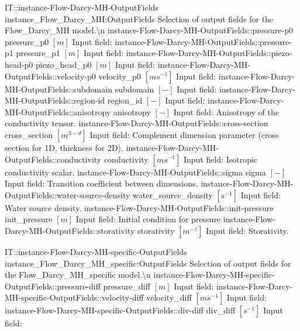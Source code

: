 \begin{SelectionType}
	{IT::instance-Flow-Darcy-MH-OutputFields}
	{instance{\_}Flow{\_}Darcy{\_}MH:OutputFields}
	{{{Selection of output fields for the Flow{\_}Darcy{\_}MH model.{\textbackslash}n}%
}}
		\SelectionItem
			{instance-Flow-Darcy-MH-OutputFields::pressure-p0}
			{pressure{\_}p0}
			{{{}{$[m]$}{ Input field: }%
}}
		\SelectionItem
			{instance-Flow-Darcy-MH-OutputFields::pressure-p1}
			{pressure{\_}p1}
			{{{}{$[m]$}{ Input field: }%
}}
		\SelectionItem
			{instance-Flow-Darcy-MH-OutputFields::piezo-head-p0}
			{piezo{\_}head{\_}p0}
			{{{}{$[m]$}{ Input field: }%
}}
		\SelectionItem
			{instance-Flow-Darcy-MH-OutputFields::velocity-p0}
			{velocity{\_}p0}
			{{{}{$[ms^{-1}]$}{ Input field: }%
}}
		\SelectionItem
			{instance-Flow-Darcy-MH-OutputFields::subdomain}
			{subdomain}
			{{{}{$[-]$}{ Input field: }%
}}
		\SelectionItem
			{instance-Flow-Darcy-MH-OutputFields::region-id}
			{region{\_}id}
			{{{}{$[-]$}{ Input field: }%
}}
		\SelectionItem
			{instance-Flow-Darcy-MH-OutputFields::anisotropy}
			{anisotropy}
			{{{}{$[-]$}{ Input field: Anisotropy of the conductivity tensor.}%
}}
		\SelectionItem
			{instance-Flow-Darcy-MH-OutputFields::cross-section}
			{cross{\_}section}
			{{{}{$[m^{3-d}]$}{ Input field: Complement dimension parameter (cross section for 1D, thickness for 2D).}%
}}
		\SelectionItem
			{instance-Flow-Darcy-MH-OutputFields::conductivity}
			{conductivity}
			{{{}{$[ms^{-1}]$}{ Input field: Isotropic conductivity scalar.}%
}}
		\SelectionItem
			{instance-Flow-Darcy-MH-OutputFields::sigma}
			{sigma}
			{{{}{$[-]$}{ Input field: Transition coefficient between dimensions.}%
}}
		\SelectionItem
			{instance-Flow-Darcy-MH-OutputFields::water-source-density}
			{water{\_}source{\_}density}
			{{{}{$[s^{-1}]$}{ Input field: Water source density.}%
}}
		\SelectionItem
			{instance-Flow-Darcy-MH-OutputFields::init-pressure}
			{init{\_}pressure}
			{{{}{$[m]$}{ Input field: Initial condition for pressure}%
}}
		\SelectionItem
			{instance-Flow-Darcy-MH-OutputFields::storativity}
			{storativity}
			{{{}{$[m^{-1}]$}{ Input field: Storativity.}%
}}
\end{SelectionType}
\begin{SelectionType}
	{IT::instance-Flow-Darcy-MH-specific-OutputFields}
	{instance{\_}Flow{\_}Darcy{\_}MH{\_}specific:OutputFields}
	{{{Selection of output fields for the Flow{\_}Darcy{\_}MH{\_}specific model.{\textbackslash}n}%
}}
		\SelectionItem
			{instance-Flow-Darcy-MH-specific-OutputFields::pressure-diff}
			{pressure{\_}diff}
			{{{}{$[m]$}{ Input field: }%
}}
		\SelectionItem
			{instance-Flow-Darcy-MH-specific-OutputFields::velocity-diff}
			{velocity{\_}diff}
			{{{}{$[ms^{-1}]$}{ Input field: }%
}}
		\SelectionItem
			{instance-Flow-Darcy-MH-specific-OutputFields::div-diff}
			{div{\_}diff}
			{{{}{$[s^{-1}]$}{ Input field: }%
}}
\end{SelectionType}
